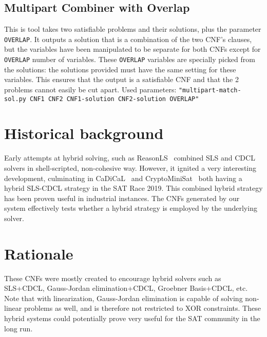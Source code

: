 \documentclass[final]{ieee}
\begin{document}
\subsection{Multipart Combiner with Overlap}
This is tool takes two satisfiable problems and their solutions, plus the parameter \texttt{OVERLAP}. It outputs a solution that is a combination of the two CNF's clauses, but the variables have been manipulated to be separate for both CNFs except for \texttt{OVERLAP} number of variables. These \texttt{OVERLAP} variables are specially picked from the solutions: the solutions provided must have the same setting for these variables. This ensures that the output is a satisfiable CNF and that the 2 problems cannot easily be cut apart. Used parameters: \texttt{"multipart-match-sol.py CNF1 CNF2 CNF1-solution CNF2-solution OVERLAP"}


\section{Historical background}
Early attempts at hybrid solving, such as ReasonLS~\cite{shaoweixindi} combined SLS and CDCL solvers in shell-scripted, non-cohesive way. However, it ignited a very interesting development, culminating in CaDiCaL~\cite{biere2018cadical} and CryptoMiniSat~\cite{CMS} both having a hybrid SLS-CDCL strategy in the SAT Race 2019. This combined hybrid strategy has been proven useful in industrial instances. The CNFs generated by our system effectively tests whether a hybrid strategy is employed by the underlying solver.

\section{Rationale}
These CNFs were mostly created to encourage hybrid solvers such as SLS+CDCL, Gauss-Jordan elimination+CDCL, Groebner Basis+CDCL, etc. Note that with linearization, Gauss-Jordan elimination is capable of solving non-linear problems as well, and is therefore not restricted to XOR constraints. These hybrid systems could potentially prove very useful for the SAT community in the long run.




\vfill
\pagebreak
\end{document}

